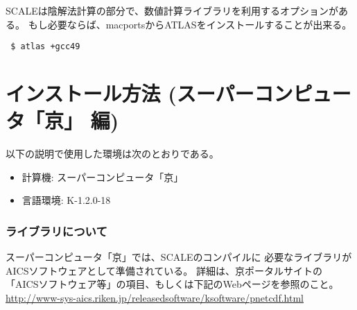 SCALEは陰解法計算の部分で、数値計算ライブラリを利用するオプションがある。
もし必要ならば、macportsからATLASをインストールすることが出来る。
\begin{verbatim}
 $ atlas +gcc49
\end{verbatim}


%
%
%


\section{インストール方法 (スーパーコンピュータ「京」 編)}

以下の説明で使用した環境は次のとおりである。
\begin{itemize}
\item 計算機: スーパーコンピュータ「京」
\item 言語環境: K-1.2.0-18
\end{itemize}

\subsubsection{ライブラリについて}
スーパーコンピュータ「京」では、SCALEのコンパイルに
必要なライブラリがAICSソフトウェアとして準備されている。
詳細は、京ポータルサイトの「AICSソフトウェア等」の項目、もしくは下記のWebページを参照のこと。\\
\noindent \url{http://www-sys-aics.riken.jp/releasedsoftware/ksoftware/pnetcdf.html}

